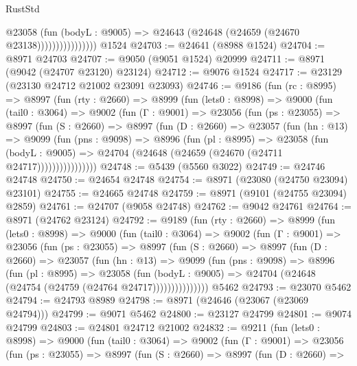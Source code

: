\begin{lexlean}{RustStd}
\begin{coremodule}
                          @23058
                            (fun (bodyL : @9005) =>
                            @24643 (@24648 (@24659 (@24670 @23138))))))))))))))))
    @1524
@24703 := @24641 (@8988 @1524)
@24704 := @8971 @24703
@24707 := @9050 (@9051 @1524) @20999
@24711 := @8971 (@9042 (@24707 @23120) @23124)
@24712 := @9076 @1524
@24717 := @23129 (@23130 @24712 @21002 @23091 @23093)
@24746 := @9186
    (fun (rc : @8995) =>
    @8997
      (fun (rty : @2660) =>
      @8999
        (fun (lets0 : @8998) =>
        @9000
          (fun (tail0 : @3064) =>
          @9002
            (fun (Γ : @9001) =>
            @23056
              (fun (ps : @23055) =>
              @8997
                (fun (S : @2660) =>
                @8997
                  (fun (D : @2660) =>
                  @23057
                    (fun (hn : @13) =>
                    @9099
                      (fun (pns : @9098) =>
                      @8996
                        (fun (pl : @8995) =>
                        @23058
                          (fun (bodyL : @9005) =>
                          @24704 (@24648 (@24659 (@24670 (@24711 @24717))))))))))))))))
@24748 := @5439 (@5560 @3022)
@24749 := @24746 @24748
@24750 := @24654 @24748
@24754 := @8971 (@23080 (@24750 @23094) @23101)
@24755 := @24665 @24748
@24759 := @8971 (@9101 (@24755 @23094) @2859)
@24761 := @24707 (@9058 @24748)
@24762 := @9042 @24761
@24764 := @8971 (@24762 @23124)
@24792 := @9189
    (fun (rty : @2660) =>
    @8999
      (fun (lets0 : @8998) =>
      @9000
        (fun (tail0 : @3064) =>
        @9002
          (fun (Γ : @9001) =>
          @23056
            (fun (ps : @23055) =>
            @8997
              (fun (S : @2660) =>
              @8997
                (fun (D : @2660) =>
                @23057
                  (fun (hn : @13) =>
                  @9099
                    (fun (pns : @9098) =>
                    @8996
                      (fun (pl : @8995) =>
                      @23058
                        (fun (bodyL : @9005) =>
                        @24704 (@24648 (@24754 (@24759 (@24764 @24717)))))))))))))))
    @5462
@24793 := @23070 @5462
@24794 := @24793 @8989
@24798 := @8971 (@24646 (@23067 (@23069 @24794)))
@24799 := @9071 @5462
@24800 := @23127 @24799
@24801 := @9074 @24799
@24803 := @24801 @24712 @21002
@24832 := @9211
    (fun (lets0 : @8998) =>
    @9000
      (fun (tail0 : @3064) =>
      @9002
        (fun (Γ : @9001) =>
        @23056
          (fun (ps : @23055) =>
          @8997
            (fun (S : @2660) =>
            @8997
              (fun (D : @2660) =>

\end{coremodule}
\end{lexlean}

